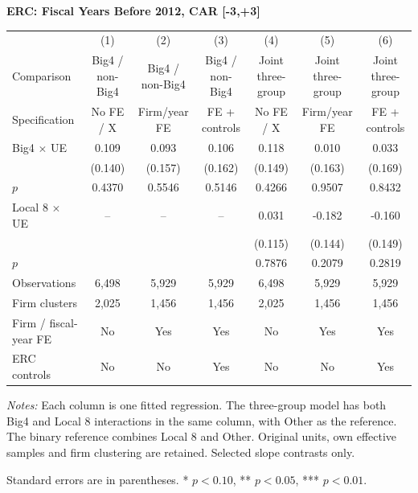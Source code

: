 \documentclass[10pt]{article}
\begin{document}
\begin{minipage}{23.60cm}
\fontsize{10}{12}\selectfont
\setlength{\tabcolsep}{4pt}\renewcommand{\arraystretch}{1.08}
{\large\bfseries ERC: Fiscal Years Before 2012, CAR [-3,+3]}\par\medskip
\begin{tabular*}{\linewidth}{@{\extracolsep{\fill}}lcccccc@{}}
\toprule
 & (1) & (2) & (3) & (4) & (5) & (6) \\
Comparison & Big4 / non-Big4 & Big4 / non-Big4 & Big4 / non-Big4 & Joint three-group & Joint three-group & Joint three-group \\
Specification & No FE / X & Firm/year FE & FE + controls & No FE / X & Firm/year FE & FE + controls \\
\midrule
Big4 $\times$ UE & 0.109 & 0.093 & 0.106 & 0.118 & 0.010 & 0.033 \\
 & (0.140) & (0.157) & (0.162) & (0.149) & (0.163) & (0.169) \\
$p$ & 0.4370 & 0.5546 & 0.5146 & 0.4266 & 0.9507 & 0.8432 \\
Local 8 $\times$ UE & -- & -- & -- & 0.031 & -0.182 & -0.160 \\
 &  &  &  & (0.115) & (0.144) & (0.149) \\
$p$ &  &  &  & 0.7876 & 0.2079 & 0.2819 \\
\midrule
Observations & 6,498 & 5,929 & 5,929 & 6,498 & 5,929 & 5,929 \\
Firm clusters & 2,025 & 1,456 & 1,456 & 2,025 & 1,456 & 1,456 \\
Firm / fiscal-year FE & No & Yes & Yes & No & Yes & Yes \\
ERC controls & No & No & Yes & No & No & Yes \\
\bottomrule\end{tabular*}\par\medskip
\fontsize{9}{11}\selectfont\textit{Notes:} Each column is one fitted regression. The three-group model has both Big4 and Local 8 interactions in the same column, with Other as the reference. The binary reference combines Local 8 and Other. Original units, own effective samples and firm clustering are retained. Selected slope contrasts only.
\par Standard errors are in parentheses. * $p<0.10$, ** $p<0.05$, *** $p<0.01$.
\end{minipage}
\end{document}
